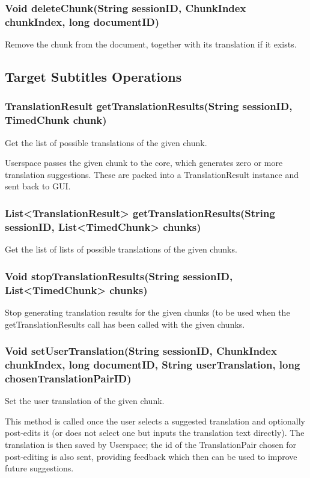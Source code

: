 
\subsubsection{Void deleteChunk(String sessionID, ChunkIndex chunkIndex, long documentID)}
Remove the chunk from the document, together with its translation if it exists.

\subsection{Target Subtitles Operations}

\subsubsection{TranslationResult getTranslationResults(String sessionID, TimedChunk chunk)}
Get the list of possible translations of the given chunk.

Userspace passes the given chunk to the core, which generates zero or more translation suggestions.
These are packed into a TranslationResult instance and sent back to GUI.

\subsubsection{List<TranslationResult> getTranslationResults(String sessionID, List<TimedChunk> chunks)}
Get the list of lists of possible translations of the given chunks.

\subsubsection{Void stopTranslationResults(String sessionID, List<TimedChunk> chunks)}
Stop generating translation results for the given chunks
(to be used when the getTranslationResults call has been called
with the given chunks.

\subsubsection{Void setUserTranslation(String sessionID, ChunkIndex chunkIndex, long documentID, String userTranslation, long chosenTranslationPairID)}
Set the user translation of the given chunk.

This method is called once the user selects a suggested translation and optionally post-edits it
(or does not select one but inputs the translation text directly).
The translation is then saved by Userspace;
the id of the TranslationPair chosen for post-editing is also sent, providing feedback which then can be used to improve future suggestions.

